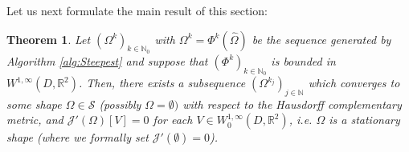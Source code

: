 \documentclass[a4paper,10pt]{article}
\newcommand{\Omref}{\hat \Omega}
\theoremstyle{plain}
\newtheorem{thm}{Theorem}[section]
\theoremstyle{plain}
\numberwithin{equation}{section}
\begin{document}
\vspace{2mm}
\noindent
Let us next formulate the main result of this section:

\begin{thm}\label{conv2}
Let $(\Omega^k)_{k \in \mathbb N_0}$ with $\Omega^k=\Phi^k(\Omref)$ be the sequence generated by Algorithm \ref{alg:Steepest} and suppose
that $(\Phi^k)_{k \in \mathbb N_0}$ is bounded in $W^{1,\infty}(D,\mathbb R^2)$. Then, there exists a subsequence $(\Omega^{k_j})_{j \in \mathbb N}$ which converges to some shape $\Omega \in \mathcal S$ (possibly $\Omega=\emptyset)$ with respect to the Hausdorff complementary metric,  
and $\mathcal J'(\Omega)[V] = 0$ for each $V \in W^{1,\infty}_0(D,\mathbb R^2)$, i.e. $\Omega$ is a stationary shape (where we formally set $\mathcal J'(\emptyset)=0$).
\end{thm}
\end{document}
